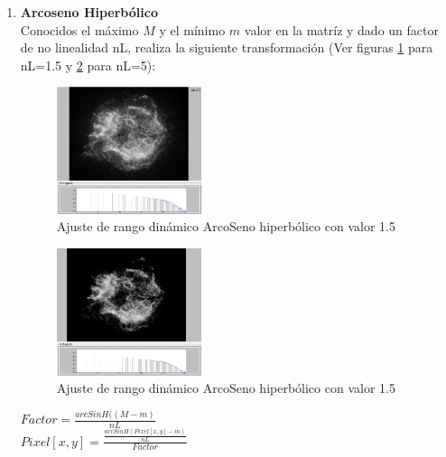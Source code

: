 \begin{enumerate}
		\clearpage
		\item \textbf{Arcoseno Hiperbólico}\\
		Conocidos el máximo $M$ y el mínimo $m$ valor en la matríz y dado
		un factor de no linealidad nL, realiza la siguiente transformación  (Ver figuras \ref{fig:HDRasinh1_5} para nL=1.5 y \ref{fig:HDRasinh5} para nL=5):\\
			\begin{figure}[!htb]
				\centering
				\includegraphics[width=0.4\textwidth]{images/HDREQ/chandraaSinH_0_5.jpg}
				\caption{\label{fig:HDRasinh1_5}{\small Ajuste de rango dinámico ArcoSeno hiperbólico con valor 1.5}}
			\end{figure}
			\begin{figure}[!htb]
				\centering
				\includegraphics[width=0.4\textwidth]{images/HDREQ/chandraaSinH_5.PNG}
				\caption{\label{fig:HDRasinh5}{\small Ajuste de rango dinámico ArcoSeno hiperbólico con valor 1.5}}
			\end{figure}
			\begin{center}
				{\large $Factor=\frac{arcSinH((M-m)}{nL}$}
				\\
				{\large $Pixel[x,y]=\frac{\frac{arcSinH(Pixel[x,y]-m)}{nL}}{Factor}$}
			\end{center}
		\vfill



\end{enumerate}
